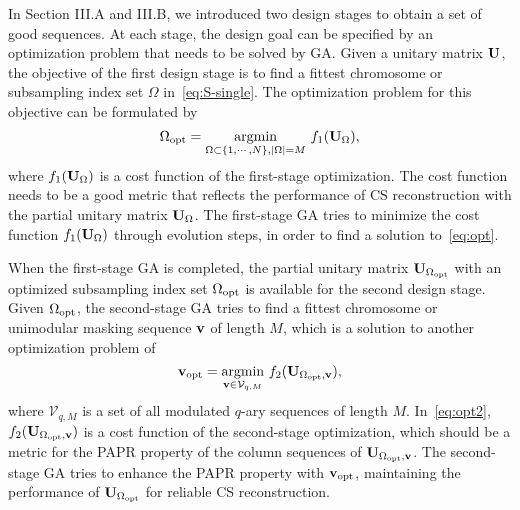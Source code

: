 \documentclass[journal]{IEEEtran}
\newcommand{\mV}{\mathcal{V}}
\newcommand{\abu}{{\bf a}}
\newcommand{\vbu}{{\bf v}}
\newcommand{\Abu}{{\bf A}}
\newcommand{\Rbu}{{\bf R}}
\newcommand{\Ubu}{{\bf U}}
\numberwithin{const2}{const}
\begin{document}
In Section III.A and III.B, 
we introduced two design stages to obtain a set of good sequences.
At each stage, the design goal can be specified by
an optimization problem that needs to be solved by GA. 
Given a unitary matrix $\Ubu$, 
the objective of the first design stage is to find a fittest chromosome 
or subsampling index set $\Omega$ in~\eqref{eq:S-single}. 
The optimization problem 
for this objective can be formulated by
\begin{equation}\label{eq:opt}
	\Omega_{\rm opt} = \underset{\Omega \subset \{1, \cdots, N\}, |\Omega| = M}{\mbox{argmin}} \ f_1 (\Ubu_\Omega), 
\end{equation} 
where $f_1 (\Ubu_\Omega)$ is a cost function of the first-stage optimization.
The cost function needs to be a good metric 
that reflects the performance of CS reconstruction
with the partial unitary matrix $\Ubu_{\Omega}$. 
The first-stage GA tries to minimize the cost function $f_1 (\Ubu_\Omega)$ through evolution steps,
in order to find a solution to~\eqref{eq:opt}.


When the first-stage GA is completed, 
the partial unitary matrix $\Ubu_{\Omega_{\rm opt}}$ with an optimized subsampling index set $\Omega_{\rm opt}$ 
is available for the second design stage. 
Given $\Omega_{\rm opt}$, 
the second-stage GA tries to find a fittest chromosome or unimodular masking sequence $\vbu$ of length $M$,
which is a solution to another optimization problem of
\begin{equation}\label{eq:opt2}
	\vbu_{\rm opt} = \underset{\vbu \in \mV_{q, M}}{\mbox{argmin}} \ f_2 (\Ubu_{\Omega_{\rm opt}, \vbu}) ,
\end{equation}
where $\mV_{q, M}$ is a set of all modulated $q$-ary sequences of length $M$.
In~\eqref{eq:opt2}, $f_2 (\Ubu_{\Omega_{\rm opt}, \vbu})$ is a cost function of 
the second-stage optimization, which
should be a metric for the PAPR property of 
the column sequences of $\Ubu_{\Omega_{\rm opt}, \vbu} $.
The second-stage GA tries to enhance the PAPR property with $\vbu_{\rm opt}$,
maintaining the performance of $\Ubu_{\Omega_{\rm opt}}$ for reliable CS reconstruction.
 
\end{document}
